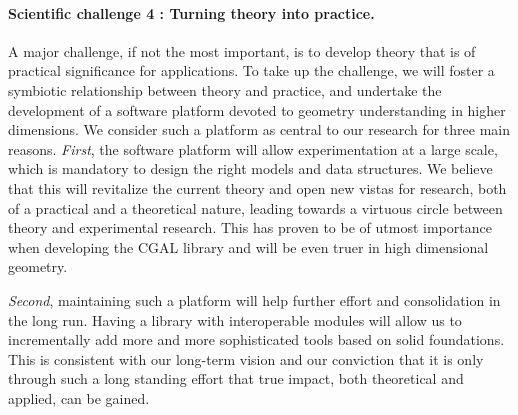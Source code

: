 


\paragraph{Scientific challenge 4 : Turning theory into practice.}%
A major challenge, if not the most important, is to develop theory that is of practical significance for applications.   To take up the challenge, we will foster a symbiotic relationship between theory and practice, and  undertake the development of a software platform devoted to geometry understanding in higher dimensions. 
We consider such a platform as central to our research  for three main reasons.  {\em First}, the software platform will allow experimentation at a large scale, which is mandatory to design the right models and data structures. We believe that this will revitalize the current theory and open new vistas for research, both of a practical and a theoretical nature, leading towards a virtuous circle between theory and experimental research. This has proven to be of utmost importance
when developing the CGAL library and will be even truer in high dimensional geometry.

{\em Second}, maintaining such a platform will help further effort and consolidation in the long run.  Having a library with interoperable modules will allow us to incrementally add more and more sophisticated tools based on solid foundations.  This is consistent with our long-term vision and our conviction that it is only through such a long standing effort that true impact, both theoretical and applied, can be gained.

